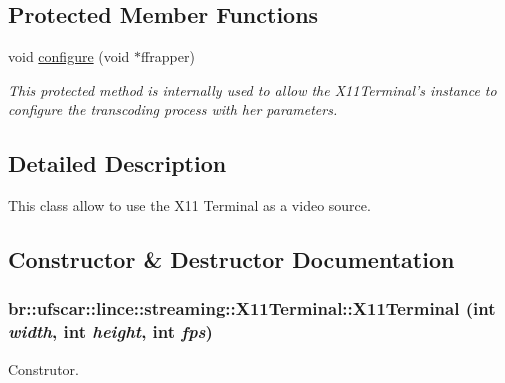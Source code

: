 \subsection*{Protected Member Functions}
\begin{DoxyCompactItemize}
\item 
void \hyperlink{classbr_1_1ufscar_1_1lince_1_1streaming_1_1X11Terminal_ada874bb3c4ab58963a29c6ae0cdf25ed}{configure} (void $\ast$ffrapper)
\begin{DoxyCompactList}\small\item\em This protected method is internally used to allow the X11Terminal's instance to configure the transcoding process with her parameters. \item\end{DoxyCompactList}\end{DoxyCompactItemize}


\subsection{Detailed Description}
This class allow to use the X11 Terminal as a video source. 

\subsection{Constructor \& Destructor Documentation}
\hypertarget{classbr_1_1ufscar_1_1lince_1_1streaming_1_1X11Terminal_a2b6c293d655945d52e0d4d3ab7205e09}{
\subsubsection[{X11Terminal}]{\setlength{\rightskip}{0pt plus 5cm}br::ufscar::lince::streaming::X11Terminal::X11Terminal (int {\em width}, \/  int {\em height}, \/  int {\em fps})}}
\label{classbr_1_1ufscar_1_1lince_1_1streaming_1_1X11Terminal_a2b6c293d655945d52e0d4d3ab7205e09}


Construtor. 


